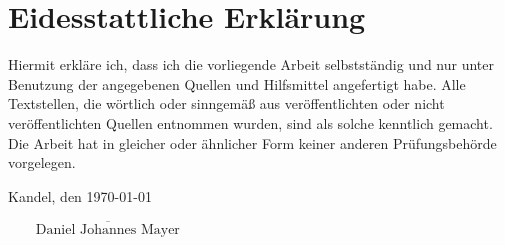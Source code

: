 %
%

\chapter*{Eidesstattliche Erklärung}
\thispagestyle{empty}
Hiermit erkläre ich, dass ich die vorliegende Arbeit selbstständig und nur unter Benutzung der angegebenen Quellen und Hilfsmittel angefertigt habe. Alle Textstellen, die wörtlich oder sinngemäß aus veröffentlichten oder nicht veröffentlichten Quellen entnommen wurden, sind als solche kenntlich gemacht. Die Arbeit hat in gleicher oder ähnlicher Form keiner anderen Prüfungsbehörde vorgelegen.
 \vspace{2\baselineskip}

\noindent Kandel, den \today
\begin{flushright}
$\overline{~~~~~~~~~\mbox{Daniel Johannes Mayer}~~~~~~~~~}$
\end{flushright}